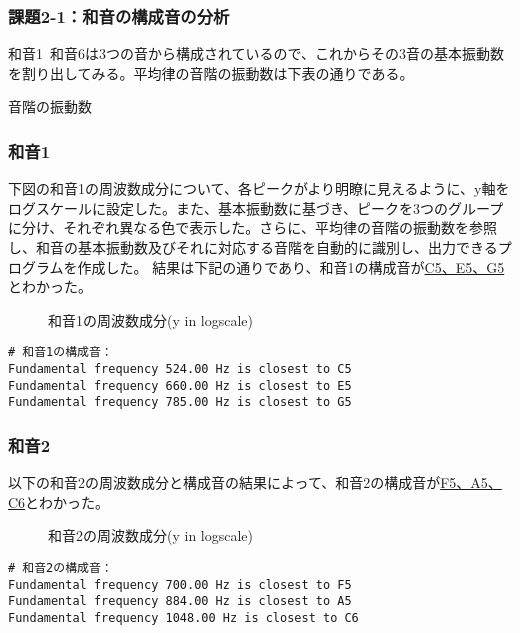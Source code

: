\documentclass{article}
\begin{document}
\subsubsection{課題2-1：和音の構成音の分析}
    \begin{spacing}{1.2}
        和音1~和音6は3つの音から構成されているので、これからその3音の基本振動数を割り出してみる。平均律の音階の振動数は下表の通りである。
        \begin{table}[ht] %
            \centering
            \caption{音階の振動数}
        \end{table}
        \subsubsection*{和音1}
        下図の和音1の周波数成分について、各ピークがより明瞭に見えるように、y軸をログスケールに設定した。また、基本振動数に基づき、ピークを3つのグループに分け、それぞれ異なる色で表示した。さらに、平均律の音階の振動数を参照し、和音の基本振動数及びそれに対応する音階を自動的に識別し、出力できるプログラムを作成した。
        結果は下記の通りであり、和音1の構成音が\underline{C5、E5、G5}とわかった。
        \begin{figure}[ht] %
            \centering
            \caption{和音1の周波数成分(y in logscale)}
        \end{figure}
        \FloatBarrier
        \begin{lstlisting}
# 和音1の構成音：
Fundamental frequency 524.00 Hz is closest to C5
Fundamental frequency 660.00 Hz is closest to E5
Fundamental frequency 785.00 Hz is closest to G5
        \end{lstlisting}

        \subsubsection*{和音2}
        以下の和音2の周波数成分と構成音の結果によって、和音2の構成音が\underline{F5、A5、C6}とわかった。
        \begin{figure}[ht] %
            \centering
            \caption{和音2の周波数成分(y in logscale)}
        \end{figure}
        \FloatBarrier
        \begin{lstlisting}
# 和音2の構成音：
Fundamental frequency 700.00 Hz is closest to F5
Fundamental frequency 884.00 Hz is closest to A5
Fundamental frequency 1048.00 Hz is closest to C6
        \end{lstlisting}

\end{spacing}
\end{document}
